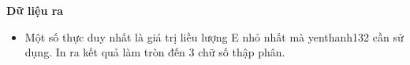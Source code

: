 \textbf{Dữ liệu ra
}
\begin{itemize}
	\item Một số thực duy nhất là giá trị liều lượng E nhỏ nhất mà yenthanh132 cần sử dụng. In ra kết quả làm tròn đến 3 chữ số thập phân.
\end{itemize}